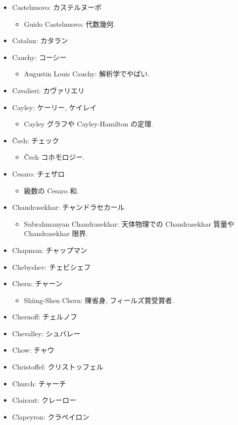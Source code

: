 \documentclass[openany, a4paper, oneside]{jsbook}
\begin{document}
\begin{itemize}
\begin{itemize}
\end{itemize}
\item Castelnuovo: カステルヌーボ
\begin{itemize}
\item Guido Castelnuovo: 代数幾何.
\end{itemize}
\item Catalan: カタラン
\item Cauchy: コーシー
\begin{itemize}
\item Augustin Louis Cauchy: 解析学でやばい.
\end{itemize}
\item Cavalieri: カヴァリエリ
\item Cayley: ケーリー, ケイレイ
\begin{itemize}
\item Cayley グラフや Cayley-Hamilton の定理.
\end{itemize}
\item \v{C}ech: チェック
\begin{itemize}
\item \v{C}ech コホモロジー.
\end{itemize}
\item Cesaro: チェザロ
\begin{itemize}
\item 級数の Cesaro 和.
\end{itemize}
\item Chandrasekhar: チャンドラセカール
\begin{itemize}
\item Subrahmanyan Chandrasekhar: 天体物理での Chandrasekhar 質量や Chandrasekhar 限界.
\end{itemize}
\item Chapman: チャップマン
\item Chebyshev: チェビシェフ
\item Chern: チャーン
\begin{itemize}
\item Shiing-Shen Chern: 陳省身, フィールズ賞受賞者.
\end{itemize}
\item Chernoff: チェルノフ
\item Chevalley: シュバレー
\item Chow: チャウ
\item Christoffel: クリストッフェル
\item Church: チャーチ
\item Clairaut: クレーロー
\item Clapeyron: クラペイロン

\end{itemize}
\end{document}
